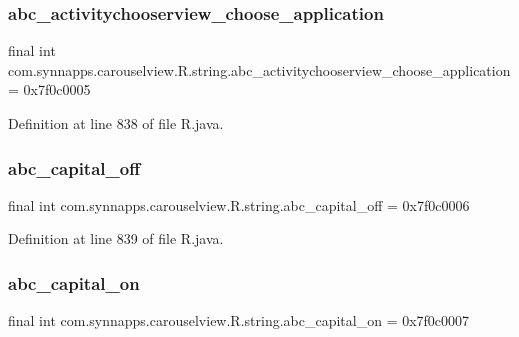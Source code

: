 \subsubsection{\texorpdfstring{abc\_activitychooserview\_choose\_application}{abc\_activitychooserview\_choose\_application}}
{\footnotesize\ttfamily final int com.\+synnapps.\+carouselview.\+R.\+string.\+abc\+\_\+activitychooserview\+\_\+choose\+\_\+application = 0x7f0c0005\hspace{0.3cm}{\ttfamily [static]}}



Definition at line 838 of file R.\+java.

\mbox{\label{classcom_1_1synnapps_1_1carouselview_1_1_r_1_1string_a441a292f6faa32155dfdf91317e3caa5}} 
\subsubsection{\texorpdfstring{abc\_capital\_off}{abc\_capital\_off}}
{\footnotesize\ttfamily final int com.\+synnapps.\+carouselview.\+R.\+string.\+abc\+\_\+capital\+\_\+off = 0x7f0c0006\hspace{0.3cm}{\ttfamily [static]}}



Definition at line 839 of file R.\+java.

\mbox{\label{classcom_1_1synnapps_1_1carouselview_1_1_r_1_1string_aa0f83a77d9e695f1fc41df5f5bce450d}} 
\subsubsection{\texorpdfstring{abc\_capital\_on}{abc\_capital\_on}}
{\footnotesize\ttfamily final int com.\+synnapps.\+carouselview.\+R.\+string.\+abc\+\_\+capital\+\_\+on = 0x7f0c0007\hspace{0.3cm}{\ttfamily [static]}}



